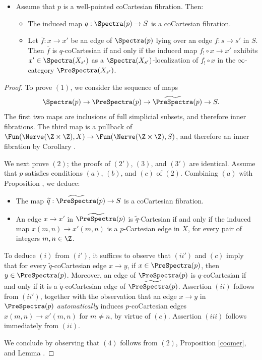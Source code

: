 \begin{proposition}
\begin{itemize}
\item[$(4)$] Assume that $p$ is a well-pointed coCartesian fibration.
Then:
\begin{itemize}
\item[$(i)$] The induced map $q: \Spectra(p) \rightarrow S$ is a coCartesian fibration.
\item[$(ii)$] Let $\overline{f}: x \rightarrow x'$ be an edge of $\Spectra(p)$ lying over an
edge $f: s \rightarrow s'$ in $S$. Then $\overline{f}$ is $q$-coCartesian if and only if the
induced map $f_{!} \circ x \rightarrow x'$ exhibits $x' \in \Spectra( X_{s'})$ as a
$\Spectra( X_{s'})$-localization of $f_{!} \circ x$ in the $\infty$-category
$\PreSpectra( X_{s'} )$.
\end{itemize}
\end{itemize}
\end{proposition}

\begin{proof}
To prove $(1)$, we consider the sequence of maps
$$ \Spectra(p) \rightarrow \PreSpectra(p) \rightarrow \widetilde{ \PreSpectra}(p) \rightarrow
S.$$
The first two maps are inclusions of full simplicial subsets, and therefore inner fibrations.
The third map is a pullback of $\Fun( \Nerve(\Z \times \Z), X) \rightarrow \Fun( \Nerve( \Z \times \Z), S)$, and therefore an inner fibration by Corollary .

We next prove $(2)$; the proofs of $(2')$, $(3)$, and $(3')$ are identical.
Assume that $p$ satisfies conditions $(a)$, $(b)$, and $(c)$ of $(2)$.
Combining $(a)$ with Proposition , we deduce:
\begin{itemize}
\item[$(i')$] The map $\widetilde{q}: \widetilde{ \PreSpectra}(p) \rightarrow S$
is a coCartesian fibration.
\item[$(ii')$] An edge $x \rightarrow x'$ in $\widetilde{\PreSpectra}(p)$ is $\widetilde{q}$-Cartesian if and only if the induced map $x(m,n) \rightarrow x'(m,n)$ is a $p$-Cartesian edge in $X$, for every
pair of integers $m,n \in \Z$.
\end{itemize}
To deduce $(i)$ from $(i')$, it suffices to observe that $(ii')$ and $(c)$ imply that
for every $\widetilde{q}$-coCartesian edge $x \rightarrow y$, if $x \in \PreSpectra(p)$, then
$y \in \PreSpectra(p)$. Moreover, an edge of $\PreSpectra(p)$ is $q$-coCartesian if and only if
it is a $\widetilde{q}$-coCartesian edge of $\widetilde{ \PreSpectra(p) }$. Assertion $(ii)$ follows
from $(ii')$, together with the observation that an edge $x \rightarrow y$ in $\PreSpectra(p)$
{\em automatically} induces $p$-coCartesian edges $x(m,n) \rightarrow x'(m,n)$ for
$m \neq n$, by virtue of $(c)$. Assertion $(iii)$ follows immediately from $(ii)$.

We conclude by observing that $(4)$ follows from $(2)$, Proposition \ref{coomer}, and
Lemma .
\end{proof}

